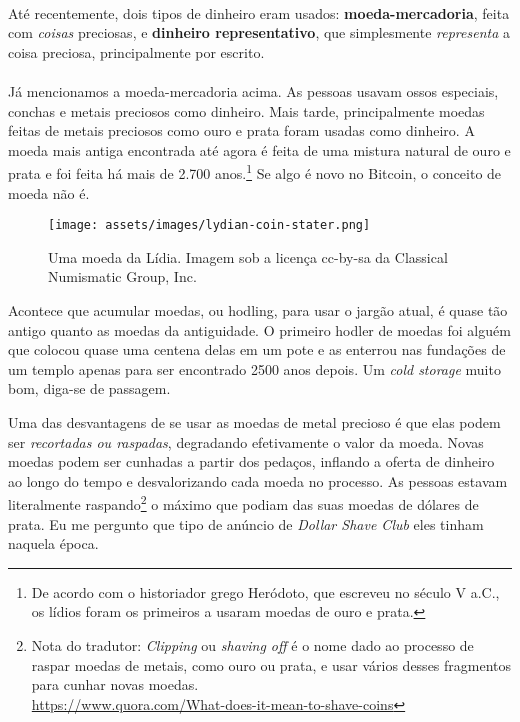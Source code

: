 \paragraph{}
Até recentemente, dois tipos de dinheiro eram usados: \textbf{moeda-mercadoria}, feita com \textit{coisas} preciosas, e \textbf{dinheiro representativo}, que simplesmente \textit{representa} a coisa preciosa, principalmente por escrito.

\paragraph{}
Já mencionamos a moeda-mercadoria acima. As pessoas usavam ossos especiais, conchas e metais preciosos como dinheiro. Mais tarde, principalmente moedas feitas de metais preciosos como ouro e prata foram usadas como dinheiro. A moeda mais antiga encontrada até agora é feita de uma mistura natural de ouro e prata e foi feita há mais de 2.700 anos.\footnote{De acordo com o historiador grego Heródoto, que escreveu no século V a.C., os lídios foram os primeiros a usaram moedas de ouro e prata.\cite{coinage-origins}} Se algo é novo no Bitcoin, o conceito de moeda não é.

\begin{figure}
  \centering
  \texttt{[image: assets/images/lydian-coin-stater.png]}
  \caption{Uma moeda da Lídia. Imagem sob a licença cc-by-sa da Classical Numismatic Group, Inc.}
  \label{fig:lydian-coin-stater}
\end{figure}

Acontece que acumular moedas, ou hodling, para usar o jargão atual, é quase tão antigo quanto as moedas da antiguidade. O primeiro hodler de moedas foi alguém que colocou quase uma centena delas em um pote e as enterrou nas fundações de um templo apenas para ser encontrado 2500 anos depois. Um \textit{cold storage} muito bom, diga-se de passagem.

Uma das desvantagens de se usar as moedas de metal precioso é que elas podem ser \textit{recortadas ou raspadas}, degradando efetivamente o valor da moeda. Novas moedas podem ser cunhadas a partir dos pedaços, inflando a oferta de dinheiro ao longo do tempo e desvalorizando cada moeda no processo. As pessoas estavam literalmente raspando\footnote{Nota do tradutor: \textit{Clipping} ou \textit{shaving off} é o nome dado ao processo de raspar moedas de metais, como ouro ou prata, e usar vários desses fragmentos para cunhar novas moedas. \\\url{https://www.quora.com/What-does-it-mean-to-shave-coins}} o máximo que podiam das suas moedas de dólares de prata. Eu me pergunto que tipo de anúncio de \textit{Dollar Shave Club} eles tinham naquela época.


